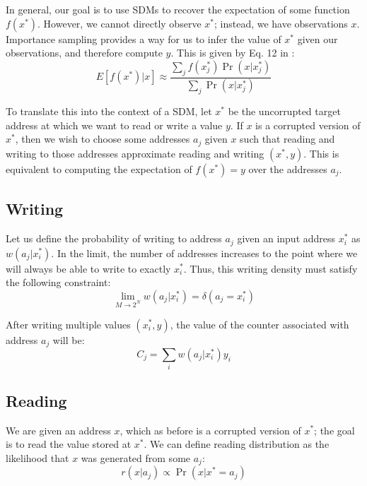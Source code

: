 \documentclass[10pt,letterpaper]{article}
\begin{document}
In general, our goal is to use SDMs to recover the expectation of some
function $f(x^*)$. However, we cannot directly observe $x^*$; instead,
we have observations $x$. Importance sampling provides a way for us to
infer the value of $x^*$ given our observations, and therefore compute
$y$. This is given by Eq. 12 in :
\begin{equation}
E[f(x^*)|x]\approx \frac{\sum_j f(x_j^*)\Pr(x|x_j^*)}{\sum_j \Pr(x|x_j^*)}
\end{equation}

To translate this into the context of a SDM, let $x^*$ be the
uncorrupted target address at which we want to read or write a value
$y$. If $x$ is a corrupted version of $x^*$, then we wish to choose
some addresses $a_j$ given $x$ such that reading and writing to those
addresses approximate reading and writing $(x^*,y)$. This is
equivalent to computing the expectation of $f(x^*)=y$ over the
addresses $a_j$.

\subsection{Writing}

Let us define the probability of writing to address $a_j$ given an
input address $x_i^*$ as $w(a_j|x_i^*)$. In the limit, the number of
addresses increases to the point where we will always be able to write
to exactly $x_i^*$. Thus, this writing density must satisfy the
following constraint:
\begin{equation}
\lim_{M\rightarrow 2^N}w(a_j|x_i^*) = \delta(a_j=x_i^*)
\label{eq:w}
\end{equation}

\noindent After writing multiple values $(x_i^*, y)$, the value of the counter
associated with address $a_j$ will be:
\begin{equation}
C_j=\sum_i w(a_j|x_i^*)y_i
\label{eq:Cj}
\end{equation}

\subsection{Reading}

We are given an address $x$, which as before is a corrupted version of
$x^*$; the goal is to read the value stored at $x^*$. We can define
reading distribution as the likelihood that $x$ was generated from
some $a_j$:
\begin{equation}
r(x| a_j)\propto \Pr(x|x^*=a_j)
\label{eq:r}
\end{equation}
\end{document}
